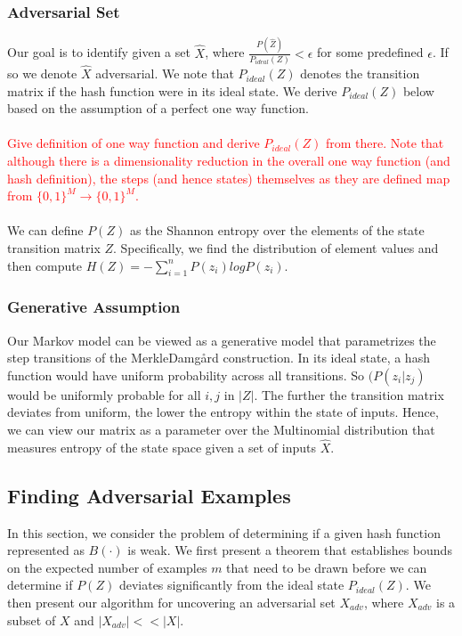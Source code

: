 \documentclass[letterpaper,twocolumn,10pt]{article}
\begin{document}
\subsubsection{Adversarial Set}
Our goal is to identify given a set $\hat{X}$, where $\frac{P(\hat{Z})}{P_{ideal}(Z)} < \epsilon$ for some predefined $\epsilon$. If so we denote $\hat{X}$ adversarial. We note that $P_{ideal}(Z)$ denotes the transition matrix if the hash function were in its ideal state. We derive $P_{ideal}(Z)$ below based on the assumption of a perfect one way function.
\\
\\
\textcolor{red}{Give definition of one way function and derive $P_{ideal}(Z)$ from there. Note that although there is a dimensionality reduction in the overall one way function (and hash definition), the steps (and hence states) themselves as they are defined map from $\{0,1\}^{M} \rightarrow \{0,1\}^{M}$.} 
\\
\\
We can define $P(Z)$ as the Shannon entropy over the elements of the state transition matrix $Z$. Specifically, we find the distribution of element values and then compute $H(Z) = -\sum_{i=1}^{n} P(z_{i}) log P(z_{i})$.

\subsubsection{Generative Assumption}
Our Markov model can be viewed as a generative model that parametrizes the step transitions of the Merkle{\textendash}Damg\r{a}rd construction. In its ideal state, a hash function would have uniform probability across all transitions. So $(P(z_{i} | z_{j})$ would be uniformly probable for all $i,j$ in $|Z|$. The further the transition matrix deviates from uniform, the lower the entropy within the state of inputs. Hence, we can view our matrix as a parameter over the Multinomial distribution that measures entropy of the state space given a set of inputs $\hat{X}$.

\subsection{Finding Adversarial Examples}
In this section, we consider the problem of determining if a given hash function represented as $B(\cdot)$ is weak. We first present a theorem that establishes bounds on the expected number of examples $m$ that need to be drawn before we can determine if $P(Z)$ deviates significantly from the ideal state $P_{ideal}(Z)$. We then present our algorithm for uncovering an adversarial set $X_{adv}$, where $X_{adv}$ is a subset of $X$ and $|X_{adv}|  << |X|$. 
\end{document}
